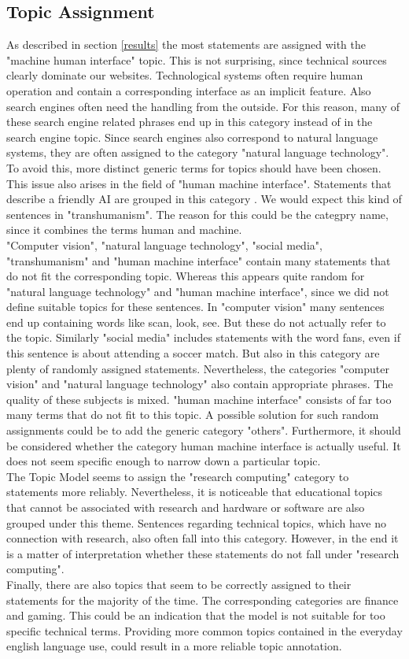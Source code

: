 \subsection{Topic Assignment}
As described in section \ref{results} the most statements are assigned with the "machine human interface" topic.
This is not surprising, since technical sources clearly dominate our websites. 
Technological systems often require human operation and contain a corresponding interface as an implicit feature.
Also search engines often need the handling from the outside. 
For this reason, many of these search engine related phrases end up in this category instead of in the search engine topic.
Since search engines also correspond to natural language systems, they are often assigned to the category "natural language technology".
To avoid this, more distinct generic terms for topics should have been chosen.
This issue also arises in the field of "human machine interface". 
Statements that describe a friendly AI are grouped in this category . 
We would expect this kind of sentences in "transhumanism".
The reason for this could be the categpry name, since it combines the terms human and machine.
\\
"Computer vision", "natural language technology", "social media", "transhumanism" and "human machine interface" contain many statements that do not fit the corresponding topic.
Whereas this appears quite random for "natural language technology" and "human machine interface", since we did not define suitable topics for these sentences.
In "computer vision" many sentences end up containing words like scan, look, see.
But these do not actually refer to the topic.
Similarly "social media" includes  statements with the word fans, even if this sentence is about attending a soccer match.
But also in this category are plenty of randomly assigned statements.
Nevertheless, the categories "computer vision" and "natural language technology" also contain appropriate phrases.  
The quality of these subjects is mixed.
"human machine interface" consists of far too many terms that do not fit to this topic. 
A possible solution for such random assignments could be to add the generic category "others".
Furthermore, it should be considered whether the category human machine interface is actually useful.
It does not seem specific enough to narrow down a particular topic.
\\
The Topic Model seems to assign the "research computing" category to statements more reliably.
Nevertheless, it is noticeable that educational topics that cannot be associated with research and hardware or software are also grouped under this theme.
Sentences regarding technical topics, which have no connection with research, also often fall into this category.
However, in the end it is a matter of interpretation whether these statements do not fall under "research computing".
\\
Finally, there are also topics that seem to be correctly assigned to their statements for the majority of the time.
The corresponding categories are finance and gaming.
This could be an indication that the model is not suitable for too specific technical terms.
Providing more common topics contained in the everyday english language use, could result in a more reliable topic annotation.
